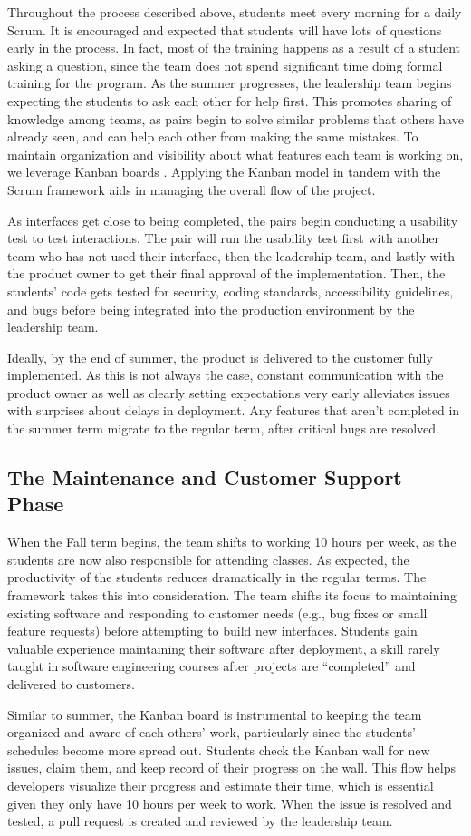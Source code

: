 Throughout the process described above, students meet every morning for a daily Scrum. It is encouraged and expected that students will have lots of questions early in the process. In fact, most of the training happens as a result of a student asking a question, since the team does not spend significant time doing formal training for the program. As the summer progresses, the leadership team begins expecting the students to ask each other for help first. This promotes sharing of knowledge among teams, as pairs begin to solve similar problems that others have already seen, and can help each other from making the same mistakes. To maintain organization and visibility about what features each team is working on, we leverage Kanban boards \cite{anderson2010kanban}. Applying the Kanban model in tandem with the Scrum framework aids in managing the overall flow of the project.

As interfaces get close to being completed, the pairs begin conducting a usability test \cite{usabilitytesting} to test interactions. The pair will run the usability test first with another team who has not used their interface, then the leadership team, and lastly with the product owner to get their final approval of the implementation. Then, the students’ code gets tested for security, coding standards, accessibility guidelines, and bugs before being integrated into the production environment by the leadership team.

Ideally, by the end of summer, the product is delivered to the customer fully implemented. As this is not always the case, constant communication with the product owner as well as clearly setting expectations very early alleviates issues with surprises about delays in deployment. Any features that aren't completed in the summer term migrate to the regular term, after critical bugs are resolved.

\subsection{The Maintenance and Customer Support Phase}
When the Fall term begins, the team shifts to working 10 hours per week, as the students are now also responsible for attending classes. As expected, the productivity of the students reduces dramatically in the regular terms. The framework takes this into consideration. The team shifts its focus to maintaining existing software and responding to customer needs (e.g., bug fixes or small feature requests) before attempting to build new interfaces. Students gain valuable experience maintaining their software after deployment, a skill rarely taught in software engineering courses after projects are ``completed'' and delivered to customers.

Similar to summer, the Kanban board is instrumental to keeping the team organized and aware of each others' work, particularly since the students' schedules become more spread out. Students check the Kanban wall for new issues, claim them, and keep record of their progress on the wall. This flow helps developers visualize their progress and estimate their time, which is essential given they only have 10 hours per week to work. When the issue is resolved and tested, a pull request is created and reviewed by the leadership team.
